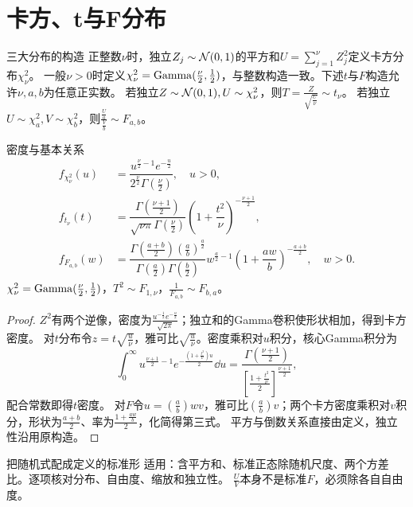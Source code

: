 \section{卡方、t与F分布}\label{sec:62}
\begin{definition}{三大分布的构造}
正整数$\nu$时，独立$Z_j\sim\mathcal N(0,1)$的平方和$U=\sum_{j=1}^\nu Z_j^2$定义卡方分布$\chi_\nu^2$。
一般$\nu>0$时定义$\chi_\nu^2=\operatorname{Gamma}(\frac{\nu}{2},\frac{1}{2})$，与整数构造一致。下述$t$与$F$构造允许$\nu,a,b$为任意正实数。
若独立$Z\sim\mathcal N(0,1),U\sim\chi_\nu^2$，则$T=\frac{Z}{\sqrt{\frac{U}{\nu}}}\sim t_\nu$。
若独立$U\sim\chi_a^2,V\sim\chi_b^2$，则$\frac{\frac{U}{a}}{\frac{V}{b}}\sim F_{a,b}$。
\end{definition}
\begin{theorem}{密度与基本关系}
\begin{align*}
f_{\chi_\nu^2}(u)&=\dfrac{u^{\frac{\nu}{2}-1}e^{-\frac{u}{2}}}{2^{\frac{\nu}{2}}\Gamma(\frac{\nu}{2})},\quad u>0,\\
f_{t_\nu}(t)&=\dfrac{\Gamma(\frac{\nu+1}{2})}{\sqrt{\nu\pi}\Gamma(\frac{\nu}{2})}(1+\dfrac{t^2}{\nu})^{-\frac{\nu+1}{2}},\\
f_{F_{a,b}}(w)&=\dfrac{\Gamma(\frac{a+b}{2})(\frac{a}{b})^{\frac{a}{2}}}{\Gamma(\frac{a}{2})\Gamma(\frac{b}{2})}
w^{\frac{a}{2}-1}(1+\dfrac{aw}{b})^{-\frac{a+b}{2}},\quad w>0.
\end{align*}
$\chi_\nu^2=\operatorname{Gamma}(\frac{\nu}{2},\frac{1}{2})$，$T^2\sim F_{1,\nu}$，$\frac{1}{F_{a,b}}\sim F_{b,a}$。
\end{theorem}
\begin{proof}
$Z^2$有两个逆像，密度为$\frac{u^{-\frac{1}{2}}e^{-\frac{u}{2}}}{\sqrt{2\pi}}$；独立和的Gamma卷积使形状相加，得到卡方密度。
对$t$分布令$z=t\sqrt{\frac{u}{\nu}}$，雅可比$\sqrt{\frac{u}{\nu}}$。密度乘积对$u$积分，核心Gamma积分为
\[\int_0^\infty u^{\frac{\nu+1}{2}-1}e^{-\frac{(1+\frac{t^2}{\nu})u}{2}}\dd u
=\dfrac{\Gamma(\frac{\nu+1}{2})}{[\frac{1+\frac{t^2}{\nu}}{2}]^{\frac{\nu+1}{2}}},\]
配合常数即得$t$密度。
对$F$令$u=(\frac{a}{b})wv$，雅可比$(\frac{a}{b})v$；两个卡方密度乘积对$v$积分，形状为$\frac{a+b}{2}$、率为$\frac{1+\frac{aw}{b}}{2}$，化简得第三式。
平方与倒数关系直接由定义，独立性沿用原构造。
\end{proof}
\begin{method}{把随机式配成定义的标准形}
适用：含平方和、标准正态除随机尺度、两个方差比。逐项核对分布、自由度、缩放和独立性。
$\frac{U}{V}$本身不是标准$F$，必须除各自自由度。
\end{method}
